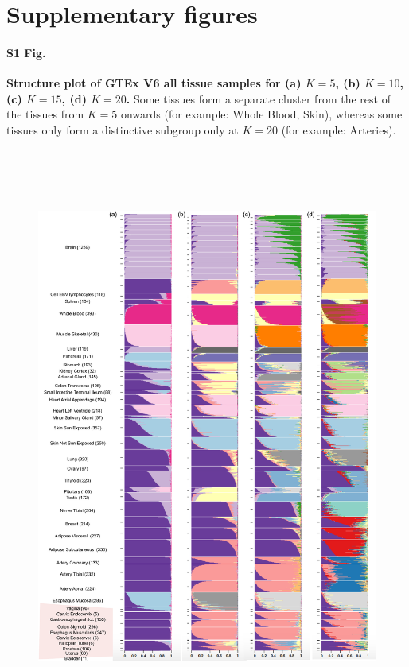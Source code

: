 \documentclass[10pt,letterpaper]{article}
\begin{document}
\section{Supplementary figures}

\paragraph*{S1 Fig.}
\label{figS0}
{\bf Structure plot of GTEx V6 all tissue samples for (a) $K=5$, (b) $K=10$, (c) $K=15$, (d) $K=20$.} Some tissues form a separate cluster from the rest of the tissues from $K=5$ onwards (for example: Whole Blood, Skin), whereas some tissues only form a distinctive subgroup only at $K=20$ (for example: Arteries).
\begin{figure}[ht]
\centering
\includegraphics[height=7.5in, width=6.5in]{../plots/gtex-figures/gtex-multiple-ks-04-30-2016}
\end{figure}
\clearpage
\end{document}
